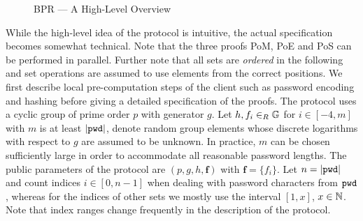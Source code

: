 \begin{figure}[htb]
{}
\caption{\acl{BPR} --- A High-Level Overview}
\label{fig:bpr-protocol-overview}
\end{figure}


While the high-level idea of the protocol is intuitive, the actual specification becomes somewhat technical.
Note that the three proofs \ac{PoM}, \ac{PoE} and \ac{PoS} can be performed in parallel.
Further note that all sets are \emph{ordered} in the following and set operations are assumed to use elements from the correct positions.
We first describe local pre-computation steps of the client such as password encoding and hashing before giving a detailed specification of the proofs.
The protocol uses a cyclic group \GG of prime order $p$ with generator $g$.
Let $h,f_i\in_R \mathbb{G}$ for $i\in[-4,m]$ with $m$ is at least $|\mathtt{pwd}|$, denote random group elements whose discrete logarithms with respect to $g$ are assumed to be unknown. 
In practice, $m$ can be chosen sufficiently large in order to accommodate all reasonable password lengths. The public parameters of the protocol are $(p,g,h,\bm f)$ with $\bm f = \{f_i\}$.
Let $n = |\mathtt{pwd}|$ and count indices $i\in[0,n-1]$ when dealing with password characters from $\mathtt{pwd}$, whereas for the indices of other sets we mostly use the interval $[1,x]$, $x\in\mathbb{N}$. Note that index ranges change frequently in the description of the protocol.

